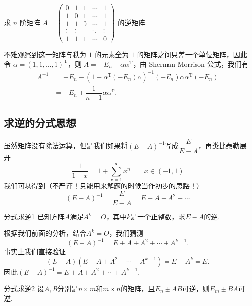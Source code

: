 \begin{example}{}{}
    求 $n$ 阶矩阵 $A = \begin{pmatrix}
        0 & 1 & 1 & \cdots & 1 \\
        1 & 0 & 1 & \cdots & 1 \\
        1 & 1 & 0 & \cdots & 1 \\
        \vdots & \vdots & \vdots & \ddots & \vdots \\
        1 & 1 & 1 & \cdots & 0
    \end{pmatrix}$ 的逆矩阵.
\end{example}
\begin{solution}
    不难观察到这一矩阵与秩为 $1$ 的元素全为 $1$ 的矩阵之间只差一个单位矩阵，因此令 $\alpha = (1,1,\ldots,1)^\mathrm{T}$，则 $A = -E_n + \alpha\alpha^\mathrm{T}$，由 Sherman-Morrison 公式，我们有
    \begin{align*}
        A^{-1} &= -E_n - (1 + \alpha^\mathrm{T}(-E_n)\alpha)^{-1}(-E_n)\alpha\alpha^\mathrm{T}(-E_n) \\
                &= -E_n + \dfrac{1}{n-1}\alpha\alpha^\mathrm{T}.
    \end{align*}
\end{solution}

\subsection{求逆的分式思想}

虽然矩阵没有除法运算，但是我们如果将$(E-A)^{-1}$写成$\dfrac{E}{E-A}$，再类比泰勒展开
\[\frac{1}{1-x}=1+\sum\limits_{n=1}^\infty x^n \qquad x\in (-1,1)\]
我们可以得到（不严谨！只能用来解题的时候当作初步的思路！）
\[(E-A)^{-1}=\frac{E}{E-A}=E+A+A^2+\cdots\]

\begin{example}{}{分式求逆1}
    已知方阵$A$满足$A^k=O$，其中$k$是一个正整数，求$E-A$的逆.
\end{example}

\begin{solution}
    根据我们前面的分析，结合$A^k=O$，我们猜测
    \[(E-A)^{-1}=E+A+A^2+\cdots+A^{k-1}.\]
    事实上我们直接验证
    \[(E-A)(E+A+A^2+\cdots+A^{k-1})=E-A^k=E.\]
    因此$(E-A)^{-1}=E+A+A^2+\cdots+A^{k-1}$.
\end{solution}

\begin{example}{}{分式求逆2}
    设$A,B$分别是$n \times m$和$m \times n$的矩阵，且$E_n \pm AB$可逆，则$E_m \pm BA$可逆.
\end{example}

